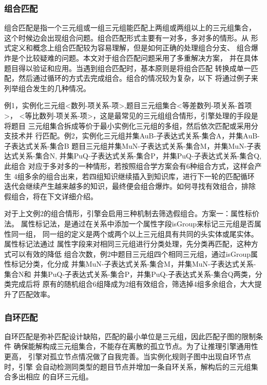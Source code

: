 \documentclass{standalone}
\begin{document}
\subsubsection{组合匹配}
组合匹配是指一个三元组或一组三元组能匹配上两组或两组以上的三元组集合，
这个时候边会出现组合问题。组合匹配形式主要有一对多，多对多的情形。从
形式定义和概念上组合匹配较为容易理解，但是如何正确的处理组合分支、
组合爆炸是个比较疑难的问题。本文对于组合匹配问题采用了多重解决方案，
并在具体题目得以验证和应用。当遇到组合匹配时，基本原则是将组合匹配
转换成单一匹配，然后通过循环的方式去完成组合。组合的情况较为复杂，以下
将通过例子来列举组合发生的几种情况。

例1，实例化三元组<数列-项关系-项>,题目三元组集合{<等差数列-项关系-首项>，
<等比数列-项关系-项>}，这是最常见的三元组组合情形，引擎处理的手段是将题目
三元组集合拆成等价于最小实例化三元组的多组，然后依次匹配或采用分支技术并
行匹配。例2，实例化三元组{并集AuB-子表达式关系-集合A，并集AuB-子表达式关系-集合B}
题目三元组{并集MuN-子表达式关系-集合M，并集MuN-子表达式关系-集合N,
并集PuQ-子表达式关系-集合P，并集PuQ-子表达式关系-集合Q},此组合
对应于多对多的一种情形，若按照组合学方案会有6种组合方式，这样会产生
4组多余的组合出来，若四组知识继续插入到知识库，进行下一轮的匹配循环
迭代会继续产生越来越多的知识，最终便会组合爆炸。如何寻找有效组合，排除
假组合，将在下文详细介绍。

对于上文例2的组合情形，引擎会启用三种机制去筛选假组合。方案一：属性标价法。
属性标记法，是通过在关系中添加一个属性字段isGroup来标记三元组是否属性同一组，
同一组的定义是两个或两个以上三元组具有共同的头实体或尾实体。属性标记法通过
属性字段来对相同三元组进行分类处理，先分类再匹配，这种方式可以有效的降低
组合次数，例2中题目三元组四个相同三元组，通过isGroup属性标记分类，化分成
{并集MuN-子表达式关系-集合M，并集MuN-子表达式关系-集合N}和
{并集PuQ-子表达式关系-集合P，并集PuQ-子表达式关系-集合Q}两类，分类完成后将
原有的随机组合6组降成为2组有效组合，筛选掉4组多余组合，大大提升了匹配效率。
\subsubsection{自环匹配}
自环匹配是弥补匹配设计缺陷，匹配的最小单位是三元组，因此匹配子图的限制条件
确保能解构成三元组集合，不能存在离散的孤立节点。为了让推理引擎通用性更高，
引擎对孤立节点情况做了自我完善。当实例化规则子图中出现自环节点时，引擎
会自动检测同类型的题目节点并增加一条自环关系，解构后的三元组集合多出相应
的自环三元组。
\end{document}
